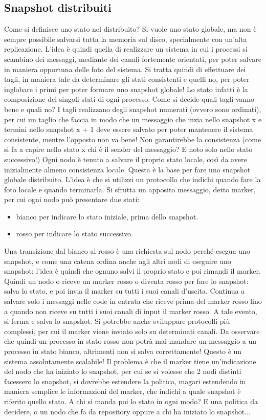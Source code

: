 \subsection{Snapshot distribuiti}
Come si definisce uno stato nel distribuito? Si vuole uno stato globale, ma non è sempre possibile salvarsi tutta la
memoria sul disco, specialmente con un'alta replicazione. L'idea è quindi quella di realizzare un sistema in cui i
processi si scambino dei messaggi, mediante dei canali fortemente orientati, per poter salvare in maniera opportuna
delle foto del sistema. Si tratta quindi di effettuare dei tagli, in maniera tale da determinare gli stati consistenti
e quelli no, per poter inglobare i primi per poter formare uno snapshot globale! Lo stato infatti è la composizione
dei singoli stati di ogni processo.
Come si decide quali tagli vanno bene e quali no? I tagli realizzano degli snapshot numerati (ovvero sono ordinati),
per cui un taglio che faccia in modo che un messaggio che inzia nello snapshot x e termini nello snapshot x + 1 deve
essere salvato per poter mantenere il sistema consistente, mentre l'opposto non va bene! Non garantirebbe la
consistenza (come si fa a capire nello stato x chi è il sender del messaggio? E noto solo nello stato successivo!)
Ogni nodo è tenuto a salvare il proprio stato locale, così da avere inizialmente almeno consistenza locale. Questa è
la base per fare uno snapshot globale distribuito. L'idea è che si utilizzi un protocollo che indichi quando fare la
foto locale e quando terminarla. Si sfrutta un apposito messaggio, detto marker, per cui ogni nodo può presentare due
stati:
\begin{itemize}
 \item bianco per indicare lo stato iniziale, prima dello snapshot.
 \item rosso per indicare lo stato successivo.
\end{itemize}
Una transizione dal bianco al rosso è una richiesta sul nodo perché esegua uno snapshot, e come una catena ordina
anche agli altri nodi di eseguire uno snapshot: l'idea è quindi che ognuno salvi il proprio stato e poi rimandi il
marker. Quindi un nodo o riceve un marker rosso o diventa rosso per fare lo snapshot: salva lo stato, e poi invia il
marker su tutti i suoi canali d'uscita. Continua a salvare solo i messaggi nelle code in entrata che riceve prima del marker rosso fino a quando non riceve su tutti i suoi canali di input il marker rosso. A tale evento, si
ferma e salva lo snapshot. Si potrebbe anche sviluppare protocolli più complessi, per cui il marker viene inviato solo su determinati canali. Da osservare che quindi un processo in stato rosso non potrà mai mandare un messaggio a un processo in stato bianco, altrimenti non si salva correttamente!
Questo è un sistema assolutamente scalabile! Il problema è che il marker tiene un'indicazione del nodo che ha iniziato lo snapshot, per cui se si volesse che 2 nodi distinti facessero lo snapshot, si dovrebbe estendere la politica, magari estendendo in maniera semplice le informazioni del marker, che indichi a quale snapshot è riferito quello stato. A chi si manda poi lo stato in ogni modo? E una politica da decidere, o un nodo che fa da repository oppure a chi ha iniziato lo snapshot...